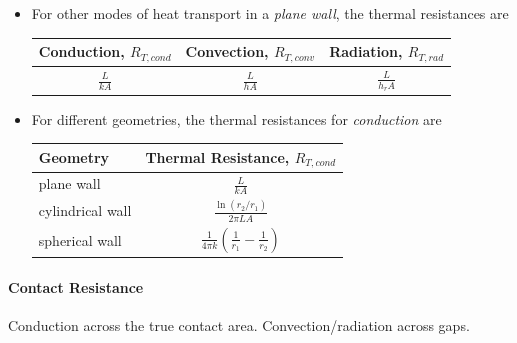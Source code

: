 \documentclass[12pt, a4paper]{article}
\begin{document}
\begin{itemize}
    \item For other modes of heat transport in a \textit{plane wall}, the thermal resistances are
    \begin{table}[H]
        \centering
        \begin{tabular}{c c c}
        \toprule
        \textbf{Conduction}, $R_{T, cond}$  &   \textbf{Convection}, $R_{T, conv}$  &   \textbf{Radiation}, $R_{T, rad}$ \\ \midrule
        $\displaystyle \frac{L}{kA}$  &   $\displaystyle \frac{L}{hA}$  &   $\displaystyle \frac{L}{h_{r}A}$\\
        \bottomrule
        \end{tabular}
    \end{table}

    \item For different geometries, the thermal resistances for \textit{conduction} are
    \begin{table}[H]
        \centering
        \begin{tabular}{lc}
            \toprule
            \textbf{Geometry}   &  \textbf{Thermal Resistance, $R_{T, cond}$} \\
            \midrule
            plane wall          &  $\displaystyle \frac{L}{kA}$ \\ [1.2em]
            cylindrical wall    &  $\displaystyle \frac{\ln(r_{2}/r_{1})}{2\pi LA}$ \\[1.2em]
            spherical wall      &  $\displaystyle \frac{1}{4\pi k} (\frac{1}{r_{1}}-\frac{1}{r_{2}})$ \\
            \bottomrule
        \end{tabular}
    \end{table}
\end{itemize}

\paragraph{Contact Resistance} Conduction across the true contact area. Convection/radiation across gaps.
\end{document}

